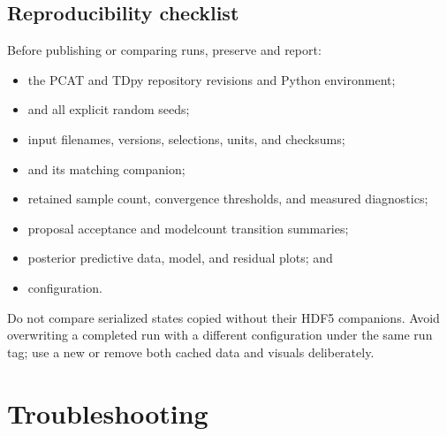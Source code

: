\documentclass[letterpaper,10pt,english]{sphinxmanual}
\begin{document}
\section{Reproducibility checklist}
\label{\detokenize{outputs:reproducibility-checklist}}
\sphinxAtStartPar
Before publishing or comparing runs, preserve and report:
\begin{itemize}
\item {}
\sphinxAtStartPar
the PCAT and TDpy repository revisions and Python environment;

\item {}
\sphinxAtStartPar
{} and all explicit random seeds;

\item {}
\sphinxAtStartPar
input filenames, versions, selections, units, and checksums;

\item {}
\sphinxAtStartPar
{} and its matching  companion;

\item {}
\sphinxAtStartPar
retained sample count, convergence thresholds, and measured diagnostics;

\item {}
\sphinxAtStartPar
proposal acceptance and model\sphinxhyphen{}count transition summaries;

\item {}
\sphinxAtStartPar
posterior predictive data, model, and residual plots; and

\item {} \begin{description}
\sphinxAtStartPar
configuration.

\end{description}

\end{itemize}

\sphinxAtStartPar
Do not compare serialized states copied without their HDF5 companions. Avoid
overwriting a completed run with a different configuration under the same run
tag; use a new  or remove both cached data and visuals deliberately.

\sphinxstepscope


\chapter{Troubleshooting}
\label{\detokenize{troubleshooting:troubleshooting}}\label{\detokenize{troubleshooting::doc}}
\end{document}
